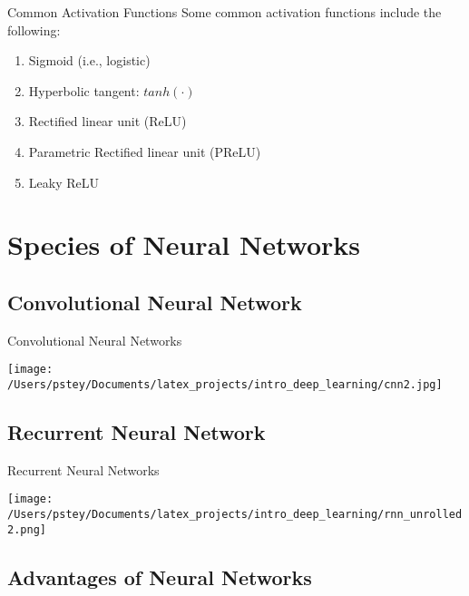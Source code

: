 \documentclass[pdf]{beamer}
\begin{document}
	
	\begin{frame}{Common Activation Functions}
	Some common activation functions include the following: 
	\vspace{1em}
	\begin{enumerate}
		\item Sigmoid (i.e., logistic)
		\item Hyperbolic tangent: $tanh(\cdot)$
		\item Rectified linear unit (ReLU)
		\item Parametric Rectified linear unit (PReLU)
		\item Leaky ReLU
	\end{enumerate}
	\end{frame}




\section{Species of Neural Networks}
	\subsection{Convolutional Neural Network}

	\begin{frame}{Convolutional Neural Networks}
	\begin{center}
		\texttt{[image: /Users/pstey/Documents/latex\_projects/intro\_deep\_learning/cnn2.jpg]}
	\end{center}
	\vspace{3em}
	\end{frame}

	\subsection{Recurrent Neural Network}

	\begin{frame}{Recurrent Neural Networks}
	\begin{center}
		\texttt{[image: /Users/pstey/Documents/latex\_projects/intro\_deep\_learning/rnn\_unrolled2.png]}
	\end{center}
	\end{frame}


\subsection{Advantages of Neural Networks}
\end{document}
